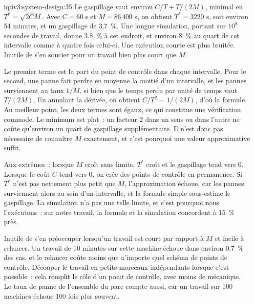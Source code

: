 \begin{solution}{iq:iv3:system-design:35}
Le gaspillage vaut environ $C/T + T/(2M)$, minimal en $T^* = \sqrt{2CM}$. Avec $C = 60$ s et $M = 86\,400$ s, on obtient $T^* = 3220$ s, soit environ 54 minutes, et un gaspillage de 3.7~\%. Une longue simulation, portant sur $10^8$ secondes de travail, donne 3.8~\% à cet endroit, et environ 8~\% au quart de cet intervalle comme à quatre fois celui-ci. Une exécution courte est plus bruitée. Inutile de s'en soucier pour un travail bien plus court que $M$.
\label{lst:iv3:sd:checkpoint}

Le premier terme est la part du point de contrôle dans chaque intervalle. Pour le second, une panne fait perdre en moyenne la moitié d'un intervalle, et les pannes surviennent au taux $1/M$, si bien que le temps perdu par unité de temps vaut $T / (2M)$. En annulant la dérivée, on obtient $C/T^2 = 1/(2M)$, d'où la formule. Au meilleur point, les deux termes sont égaux, ce qui constitue une vérification commode. Le minimum est plat~: un facteur 2 dans un sens ou dans l'autre ne coûte qu'environ un quart de gaspillage supplémentaire. Il n'est donc pas nécessaire de connaître $M$ exactement, et c'est pourquoi une valeur approximative suffit.

Aux extrêmes~: lorsque $M$ croît sans limite, $T^*$ croît et le gaspillage tend vers 0. Lorsque le coût $C$ tend vers 0, on crée des points de contrôle en permanence. Si $T^*$ n'est pas nettement plus petit que $M$, l'approximation échoue, car les pannes surviennent alors au sein d'un intervalle, et la formule simple sous-estime le gaspillage. La simulation n'a pas une telle limite, et c'est pourquoi nous l'exécutons~: sur notre travail, la formule et la simulation concordent à 15~\% près.

Inutile de s'en préoccuper lorsqu'un travail est court par rapport à $M$ et facile à relancer. Un travail de 10 minutes sur cette machine échoue dans environ 0.7~\% des cas, et le relancer coûte moins que n'importe quel schéma de points de contrôle. Découper le travail en petits morceaux indépendants lorsque c'est possible~: cela remplit le rôle d'un point de contrôle, avec moins de mécanique. Le taux de panne de l'ensemble du parc compte aussi, car un travail sur 100 machines échoue 100 fois plus souvent.

\end{solution}

